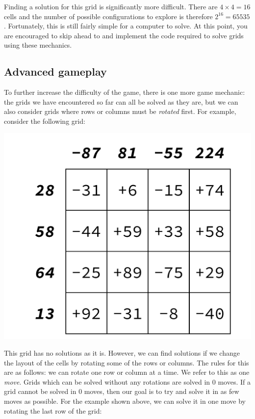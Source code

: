 Finding a solution for this grid is significantly more difficult. There are $4 \times 4 = 16$ cells and the number of possible configurations to explore is therefore $2^{16} = 65535$. Fortunately, this is still fairly simple for a computer to solve. At this point, you are encouraged to skip ahead to  and implement the code required to solve grids using these mechanics.

\subsection{Advanced gameplay}

To further increase the difficulty of the game, there is one more game mechanic: the grids we have encountered so far can all be solved as they are, but we can also consider grids where rows or columns must be \emph{rotated} first. For example, consider the following grid:
\begin{center}
	\includegraphics[scale=0.4,trim=0 30 0 30]{cswk/lac3.pdf}
\end{center}
This grid has no solutions as it is. However, we can find solutions if we change the layout of the cells by rotating some of the rows or columns. The rules for this are as follows: we can rotate one row or column at a time. We refer to this as one \emph{move}. Grids which can be solved without any rotations are solved in 0 moves. If a grid cannot be solved in 0 moves, then our goal is to try and solve it in as few moves as possible. For the example shown above, we can solve it in one move by rotating the last row of the grid:
